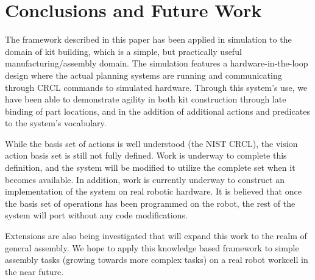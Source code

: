 \section{Conclusions and Future Work}
\label{sect:future}
The framework described in this paper has been applied in simulation to the domain of kit building, which is a simple, but practically useful manufacturing/assembly domain. The simulation features a hardware-in-the-loop design where the actual planning systems are running and communicating through CRCL commands to simulated hardware. Through this system's use, we have been able to demonstrate agility in both kit construction through late binding of part locations, and in the addition of additional actions and predicates to the system's vocabulary. 

While the basis set of actions is well understood (the NIST CRCL), the
vision action basis set is still not fully defined. Work is underway
to complete this definition, and the system will be modified to 
utilize the complete set when it becomes available. In addition,
work is currently underway to construct an implementation of the system on real robotic hardware. It is believed that once the basis set of operations has been programmed on the robot, the rest of the system will port without any code modifications. 

Extensions are also being investigated that will expand this work to the realm of general assembly. We hope to apply this knowledge based framework to simple assembly tasks (growing towards more complex tasks) on a real robot workcell in the near future. 
